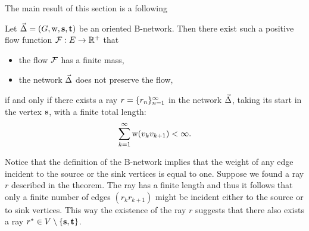 \documentclass[12pt]{article}
\begin{document}
    The main result of this section is a following
    \begin{theorem}
      \label{ray-thm}
      Let $\vec{\Delta} = (G, \mathrm{w}, \mathbf{s}, \mathbf{t})$ be an oriented B-network.
      Then there exist such a positive flow function $\mathcal{F}: E \to \mathbb{R}^{+}$ that
      \begin{itemize}
        \item the flow $\mathcal{F}$ has a finite mass,
        \item the network $\vec{\Delta}$ does not preserve the flow,
      \end{itemize}
        if and only if there exists a ray $r = \{{r}_n\}_{n=1}^\infty$ in the network $\vec{\Delta}$, taking its start in the vertex $\mathbf{s}$,
          with a finite total length:
        \[
          \sum_{k=1}^\infty \mathrm{w}(v_k v_{k+1}) < \infty.
        \]
    \end{theorem}
    \begin{remark}
      \label{inner-ray-rmk}
      Notice that the definition of the B-network implies that the weight of any edge
        incident to the source or the sink vertices is equal to one.
      Suppose we found a ray $r$ described in the theorem.
      The ray has a finite length and thus it follows that only a finite number of edges $(r_k r_{k+1})$ might
        be incident either to the source or to sink vertices.
      This way the existence of the ray $r$ suggests that there also exists a ray $r^* \in V \setminus \left\{\mathbf{s}, \mathbf{t}\right\}$.
    \end{remark}
\end{document}
